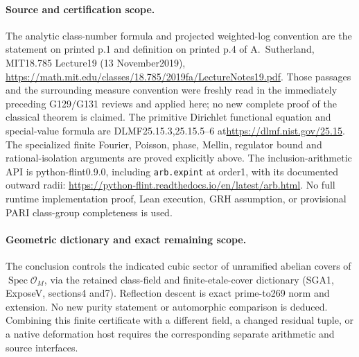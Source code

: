 \paragraph{Source and certification scope.}
The analytic class-number formula and projected weighted-log convention
are the statement on printed p.1 and definition on printed p.4 of
A.~Sutherland, MIT18.785 Lecture19 (13 November2019),
\url{https://math.mit.edu/classes/18.785/2019fa/LectureNotes19.pdf}.
Those passages and the surrounding measure convention were freshly
read in the immediately preceding G129/G131 reviews and applied here;
no new complete proof of the classical theorem is claimed.
The primitive Dirichlet functional equation and special-value formula
are DLMF25.15.3,25.15.5--6 at\url{https://dlmf.nist.gov/25.15}.
The specialized finite Fourier, Poisson, phase, Mellin, regulator bound
and rational-isolation arguments are proved explicitly above.
The inclusion-arithmetic API is python-flint0.9.0, including
\texttt{arb.expint} at order1, with its documented outward radii:
\url{https://python-flint.readthedocs.io/en/latest/arb.html}.
No full runtime implementation proof, Lean execution, GRH assumption,
or provisional PARI class-group completeness is used.

\paragraph{Geometric dictionary and exact remaining scope.}
The conclusion controls the indicated cubic sector of unramified
abelian covers of$\operatorname{Spec}\mathcal O_M$, via the retained
class-field and finite-etale-cover dictionary (SGA1, ExposeV,
sections4 and7).  Reflection descent is exact prime-to269 norm and
extension.  No new purity statement or automorphic comparison is
deduced.  Combining this finite certificate with a different field,
a changed residual tuple, or a native deformation host requires the
corresponding separate arithmetic and source interfaces.
